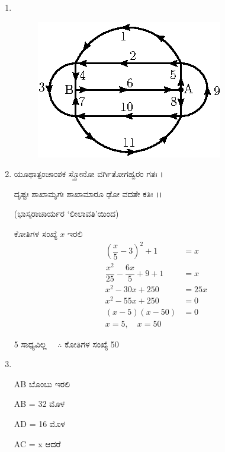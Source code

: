 \begin{enumerate}
\begin{minipage}[c]{4cm}
\begin{figure}[H]
\end{figure}
\end{minipage}

\item
~

\begin{figure}[H]
\centering
\includegraphics[scale=1.4]{images/chap5/ans20.eps}

\end{figure}


\item  ಯೂಥಾತ್ಪಂಚಾಂಶಕ ಸ್ತ್ರೋನೋ ವರ್ಗಿತೋಗಹ್ವರಂ ಗತಃ ।

ದೃಷ್ಟಃ ಶಾಖಾಮೃಗಃ ಶಾಖಾಮಾರೂ ಢೋ ವದತೇ ಕತಿಃ ।। 

\smallskip
\hfill (ಭಾಸ್ಕರಾಚಾರ್ಯರ `ಲೀಲಾವತಿ'ಯಿಂದ)

ಕೋತಿಗಳ ಸಂಖ್ಯೆ $x$ ಇರಲಿ
\begin{align*}
\left(\dfrac{x}{5} - 3 \right)^{2} + 1 & = x\\
\dfrac{x^{2}}{25} - \dfrac{6x}{5} + 9 + 1 & = x\\
x^{2} - 30x + 250 & = 25x\\
x^{2} - 55x + 250 & = 0\\
(x - 5)(x - 50) & = 0\\
x = 5,\quad x = 50 &
\end{align*}

5 ಸಾಧ್ಯವಿಲ್ಲ $\quad\therefore$ ಕೋತಿಗಳ ಸಂಖ್ಯೆ  50

\item
~

\begin{minipage}[c]{4cm}
AB ಬೊಂಬು ಇರಲಿ 

AB = 32 ಮೊಳ 

AD = 16 ಮೊಳ 

AC = x ಆದರೆ


\end{minipage}
\end{enumerate}
